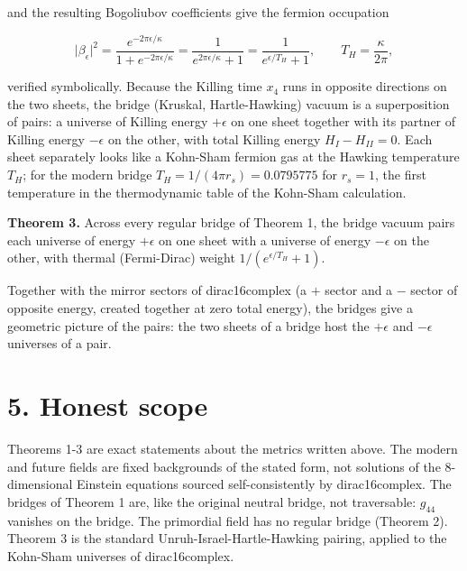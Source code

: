 \documentclass[10pt]{article}
\makeatletter
\newcommand\keepnext{\par\nopagebreak\@nobreaktrue\everypar{\@nobreakfalse\everypar{}}}
\makeatother
\begin{document}
and the resulting Bogoliubov coefficients give the fermion occupation\keepnext


\[
\lvert\beta_\epsilon\rvert^2 = \frac{e^{-2\pi\epsilon/\kappa}}{1 + e^{-2\pi\epsilon/\kappa}} = \frac{1}{e^{2\pi\epsilon/\kappa}+1} = \frac1{e^{\epsilon/T_H}+1},\qquad T_H = \frac{\kappa}{2\pi},
\]

verified symbolically. Because the Killing time $x_4$ runs in opposite directions on the two sheets, the bridge (Kruskal, Hartle-Hawking) vacuum is a superposition of pairs: a universe of Killing energy $+\epsilon$ on one sheet together with its partner of Killing energy $-\epsilon$ on the other, with total Killing energy $H_I - H_{II} = 0$. Each sheet separately looks like a Kohn-Sham fermion gas at the Hawking temperature $T_H$; for the modern bridge $T_H = 1/(4\pi r_s) = 0.0795775$ for $r_s=1$, the first temperature in the thermodynamic table of the Kohn-Sham calculation.


\textbf{Theorem 3.} Across every regular bridge of Theorem 1, the bridge vacuum pairs each universe of energy $+\epsilon$ on one sheet with a universe of energy $-\epsilon$ on the other, with thermal (Fermi-Dirac) weight $1/(e^{\epsilon/T_H}+1)$.


Together with the mirror sectors of dirac16complex (a $+$ sector and a $-$ sector of opposite energy, created together at zero total energy), the bridges give a geometric picture of the pairs: the two sheets of a bridge host the $+\epsilon$ and $-\epsilon$ universes of a pair.


\section*{5. Honest scope}

Theorems 1-3 are exact statements about the metrics written above. The modern and future fields are fixed backgrounds of the stated form, not solutions of the 8-dimensional Einstein equations sourced self-consistently by dirac16complex. The bridges of Theorem 1 are, like the original neutral bridge, not traversable: $g_{44}$ vanishes on the bridge. The primordial field has no regular bridge (Theorem 2). Theorem 3 is the standard Unruh-Israel-Hartle-Hawking pairing, applied to the Kohn-Sham universes of dirac16complex.
\end{document}
